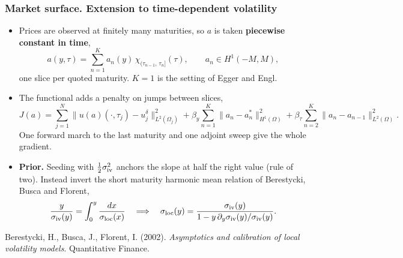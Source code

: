 \begin{frame}
\frametitle{Market surface. Extension to time-dependent volatility}
\begin{scriptsize}
\begin{itemize}
\item Prices are observed at finitely many maturities, so $a$ is taken \textbf{piecewise constant in time},
\begin{equation*}
    a(y,\tau) = \sum_{n=1}^{K} a_n(y)\,\chi_{(\tau_{n-1},\,\tau_n]}(\tau),
    \qquad a_n \in H^1(-M,M),
\end{equation*}
one slice per quoted maturity. $K = 1$ is the setting of Egger and Engl.

\item The functional adds a penalty on jumps between slices,
\begin{equation*}
    J(a) = \sum_{j=1}^{N} \bigl\| u(a)(\cdot,\tau_j) - u^\delta_j \bigr\|^2_{L^2(\Omega_j)}
         + \beta_y \sum_{n=1}^{K} \| a_n - a^*_n \|^2_{H^1(\Omega)}
         + \beta_\tau \sum_{n=2}^{K} \| a_n - a_{n-1} \|^2_{L^2(\Omega)}.
\end{equation*}
One forward march to the last maturity and one adjoint sweep give the whole gradient.

\item \textbf{Prior.} Seeding with $\tfrac12\sigma_{\mathrm{iv}}^2$ anchors the slope at half the right value (rule of two).
Instead invert the short maturity harmonic mean relation of Berestycki, Busca and Florent,
\begin{equation*}
    \frac{y}{\sigma_{\mathrm{iv}}(y)} = \int_0^y \frac{dx}{\sigma_{\mathrm{loc}}(x)}
    \quad \Longrightarrow \quad
    \sigma_{\mathrm{loc}}(y) = \frac{\sigma_{\mathrm{iv}}(y)}{1 - y\,\partial_y\sigma_{\mathrm{iv}}(y)/\sigma_{\mathrm{iv}}(y)}.
\end{equation*}
\end{itemize}
\medskip
Berestycki, H., Busca, J., Florent, I. (2002). \emph{Asymptotics and calibration of local volatility models}. Quantitative Finance.
\end{scriptsize}
\end{frame}

